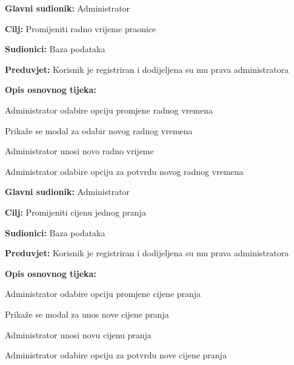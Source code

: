 \noindent {}
\begin{packed_item}
	
	\item \textbf{Glavni sudionik: } Administrator
	\item  \textbf{Cilj:} Promijeniti radno vrijeme praonice
	\item  \textbf{Sudionici:} Baza podataka
	\item  \textbf{Preduvjet:} Korisnik je registriran i dodijeljena su mu prava administratora
	\item  \textbf{Opis osnovnog tijeka:}
	
	\item[] \begin{packed_enum}
		
		\item Administrator odabire opciju promjene radnog vremena
		\item Prikaže se modal za odabir novog radnog vremena
		\item Administrator unosi novo radno vrijeme
		\item Administrator odabire opciju za potvrdu novog radnog vremena
	\end{packed_enum}
\end{packed_item}

\noindent {}
\begin{packed_item}
	
	\item \textbf{Glavni sudionik: } Administrator
	\item  \textbf{Cilj:} Promijeniti cijenu jednog pranja
	\item  \textbf{Sudionici:} Baza podataka
	\item  \textbf{Preduvjet:} Korisnik je registriran i dodijeljena su mu prava administratora
	\item  \textbf{Opis osnovnog tijeka:}
	
	\item[] \begin{packed_enum}
		
		\item Administrator odabire opciju promjene cijene pranja
		\item Prikaže se modal za unos nove cijene pranja
		\item Administrator unosi novu cijenu pranja
		\item Administrator odabire opciju za potvrdu nove cijene pranja
	\end{packed_enum}
\end{packed_item}

